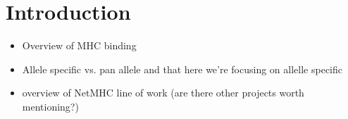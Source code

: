 \section{Introduction}
\begin{itemize}
\item Overview of MHC binding
\item Allele specific vs. pan allele and that here we're focusing on allelle specific
\item overview of NetMHC line of work (are there other projects worth mentioning?)
\end{itemize}
